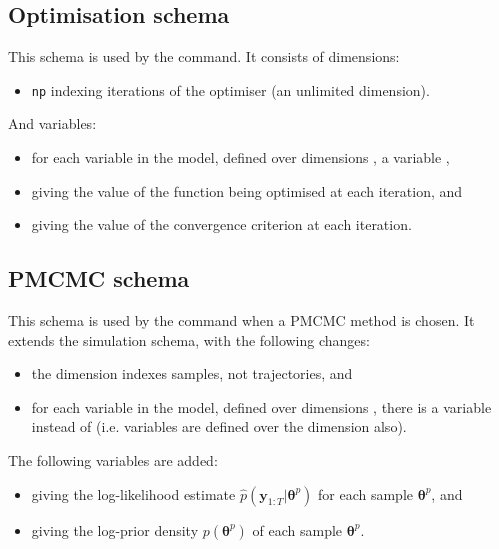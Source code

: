 \subsection{Optimisation schema}

This schema is used by the  command. It consists of
dimensions:
\begin{itemize}
\item \texttt{np} indexing iterations of the optimiser (an unlimited
  dimension).
\end{itemize}
And variables:
\begin{itemize}
\item for each  variable  in the model,
  defined over dimensions , a variable
  ,
\item {} giving the value of the function being
  optimised at each iteration, and
\item {} giving the value of the convergence criterion
  at each iteration.
\end{itemize}

\subsection{PMCMC schema}

This schema is used by the  command when a PMCMC method is
chosen. It extends the simulation schema, with the following changes:
\begin{itemize}
\item the  dimension indexes samples, not trajectories, and
\item for each  variable  in the model,
  defined over dimensions , there is a variable
   instead of
   (i.e.  variables are
  defined over the  dimension also).
\end{itemize}
The following variables are added:
\begin{itemize}
\item {} giving the log-likelihood estimate
  $\hat{p}(\mathbf{y}_{1:T}|\boldsymbol{\theta}^p)$ for each sample
  $\boldsymbol{\theta}^p$, and
\item {} giving the log-prior density
  $p(\boldsymbol{\theta}^p)$ of each sample $\boldsymbol{\theta}^p$.
\end{itemize}

